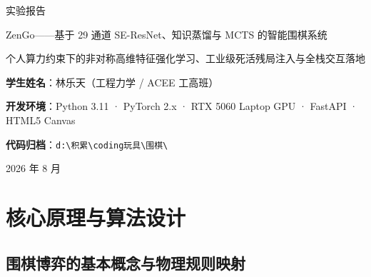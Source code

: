 \documentclass[11pt,a4paper]{ctexart}
\title{}
\author{}
\date{}
\begin{document}
\begin{titlepage}
\centering
\vspace*{2cm}
{\heiti\fontsize{32pt}{40pt}\selectfont 实验报告\par}
\vspace{1cm}
{\heiti\fontsize{24pt}{32pt}\selectfont\color[HTML]{1E3A8A} ZenGo——基于 29 通道 SE-ResNet、知识蒸馏与 MCTS 的智能围棋系统\par}
\vspace{0.8cm}
{\songti\fontsize{13pt}{18pt}\selectfont\color[HTML]{555555} 个人算力约束下的非对称高维特征强化学习、工业级死活残局注入与全栈交互落地\par}
\vspace{2.5cm}
{\songti\fontsize{14pt}{20pt}\selectfont\color[HTML]{333333} 
\textbf{学生姓名}：林乐天\quad（工程力学 / ACEE 工高班）\par
\vspace{0.3cm}
\textbf{开发环境}：Python 3.11 · PyTorch 2.x · RTX 5060 Laptop GPU · FastAPI · HTML5 Canvas\par
\vspace{0.3cm}
\textbf{代码归档}：\texttt{d:\textbackslash 积累\textbackslash coding玩具\textbackslash 围棋\textbackslash}\par
}
\vspace{2cm}
{\songti\fontsize{13pt}{18pt}\selectfont\color[HTML]{888888} 2026 年 8 月\par}
\end{titlepage}


\section{核心原理与算法设计}

\subsection{围棋博弈的基本概念与物理规则映射}
\end{document}
